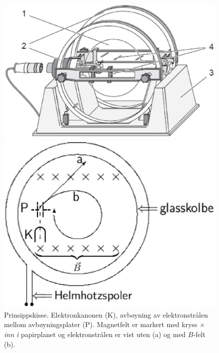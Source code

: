 \documentclass[../Elmag-labhefte-2020.tex]{subfiles}
\begin{document}
\begin{figure}[ht]
    \begin{minipage}[b]{0.45\linewidth}
        \centering
        \includegraphics[scale=0.525]{fig/FineBeamApparat.eps}
        \caption{%
            Leybold apparat med elektronkanonen innen glasskolbe (1), 
            Helmholtzspoler (2), 
            holder (3), 
            og radiusmåler (4).
        }
        \label{lorentz.fig4}
        \vspace{0.5cm}
    \end{minipage}
    \hspace{1cm}
    \begin{minipage}[b]{0.5\linewidth}
        \centering
        \includegraphics[scale=0.525]{fig/Schematic.eps}
        \caption{%
            Prinsippskisse. 
            Elektronkanonen (K), 
            avbøyning av elektronstrålen mellom avbøyningsplater (P). 
            Magnetfelt er markert med kryss $\times$ \textsl{inn i} papirplanet og elektronstrålen er vist uten (a) og med $B$-felt (b). }
        \label{lorentz.fig5}
    \end{minipage}
\end{figure}
\end{document}
